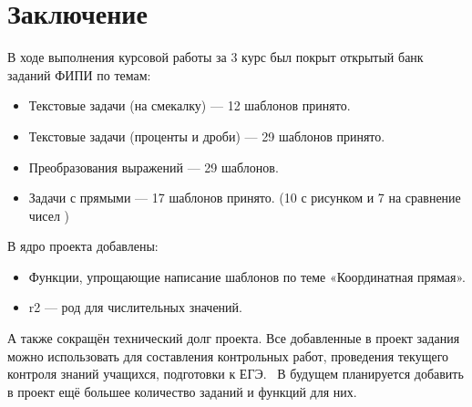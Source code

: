 \section*{Заключение}
В ходе выполнения курсовой работы за 3 курс был покрыт открытый банк заданий ФИПИ по темам:
		      \begin{itemize}
			      \item Текстовые задачи (на смекалку) — 12 шаблонов принято.
			      \item Текстовые задачи (проценты и дроби) — 29 шаблонов принято.
			      \item Преобразования выражений — 29 шаблонов.
			      \item Задачи с прямыми — 17 шаблонов принято. (10 с рисунком и 7 на сравнение чисел )
		      \end{itemize}

В ядро проекта добавлены: 
\begin{itemize}
    \item Функции, упрощающие написание шаблонов по теме «Координатная прямая».
    \item r2 — род для числительных значений.
\end{itemize}

А также сокращён технический долг проекта.
Все добавленные в проект задания можно использовать для составления контрольных работ, проведения текущего контроля знаний учащихся, подготовки к ЕГЭ.~\cite{chas-ege}
В будущем планируется добавить в проект ещё большее количество заданий и функций для них.


